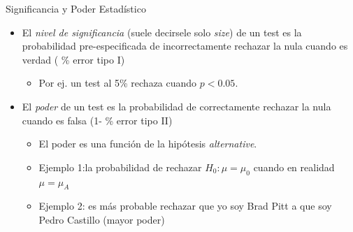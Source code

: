 \documentclass[11pt,handout,aspectratio=169]{beamer}
\begin{document}
\begin{frame}{Significancia y Poder Estadístico}
	
	\begin{itemize}
		\item El \emph{nivel de significancia} (suele decirsele solo \emph{size}) de un test es la probabilidad pre-especificada de incorrectamente rechazar la nula cuando es verdad ( \% error tipo I)
		 \pause
		 \begin{itemize}
		 	\item 
		 	Por ej. un test al 5\% rechaza cuando $p<0.05$.
		 \end{itemize}
		\pause
		\bigskip

		\item El \emph{poder} de un test es la probabilidad de correctamente rechazar la nula cuando es falsa (1- \% error tipo II)
		
			\begin{itemize}
				\item 
				El poder es una función de la hipótesis \textit{alternative}. 
				\item 
				Ejemplo 1:la probabilidad de rechazar $H_0:\mu=\mu_0$ cuando en realidad $\mu = \mu_A$
				\item 
				Ejemplo 2: es más probable rechazar que yo soy Brad Pitt a que soy Pedro Castillo (mayor poder)
			\end{itemize}
	\end{itemize}

\end{frame}
\end{document}
